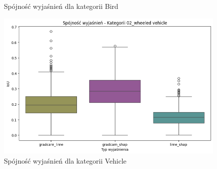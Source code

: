 \begin{figure}
\begin{minipage}[b]{0.3\textwidth}
		\caption{Spójność wyjaśnień dla kategorii Bird}  \label{}
	\end{minipage}
	\begin{minipage}[b]{0.3\textwidth}
		\centering\includegraphics[width=.9\textwidth]{img/base_coherence_vehicle}
		\caption{Spójność wyjaśnień dla kategorii Vehicle}  \label{}
	\end{minipage}
\end{figure}
